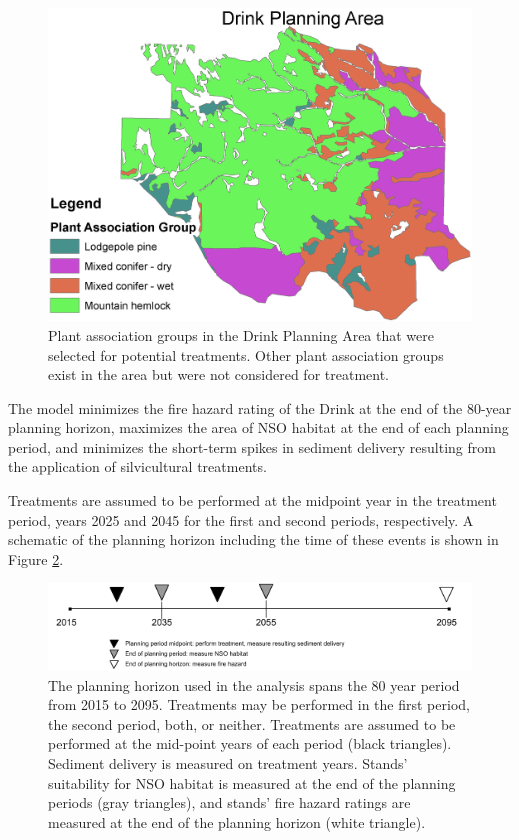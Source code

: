 \begin{figure}
\centering
\includegraphics[width=.5\textwidth]{../images/DrinkMap_PAGs}
\caption[Plant association groups in the Drink Planning Area]{Plant association groups in the Drink Planning Area that were selected for potential treatments. Other plant association groups exist in the area but were not considered for treatment.}
\label{fig:drinkPAGs}
\end{figure}

The model minimizes the fire hazard rating of the Drink at the end of the 80-year planning horizon, maximizes the area of NSO habitat at the end of each planning period, and minimizes the short-term spikes in sediment delivery resulting from the application of silvicultural treatments.

Treatments are assumed to be performed at the midpoint year in the treatment period, years 2025 and 2045 for the first and second periods, respectively. A schematic of the planning horizon including the time of these events is shown in Figure \ref{fig:drinkPlanningHorizon}.

\begin{figure}
\centering
\includegraphics[width=.85\textwidth]{../images/Drink_PlanningHorizon_Sketch}
\caption[Planning horizon schematic]{The planning horizon used in the analysis spans the 80 year period from 2015 to 2095. Treatments may be performed in the first period, the second period, both, or neither. Treatments are assumed to be performed at the mid-point years of each period (black triangles). Sediment delivery is measured on treatment years. Stands' suitability for NSO habitat is measured at the end of the planning periods (gray triangles), and stands' fire hazard ratings are measured at the end of the planning horizon (white triangle).}
\label{fig:drinkPlanningHorizon}
\end{figure}

